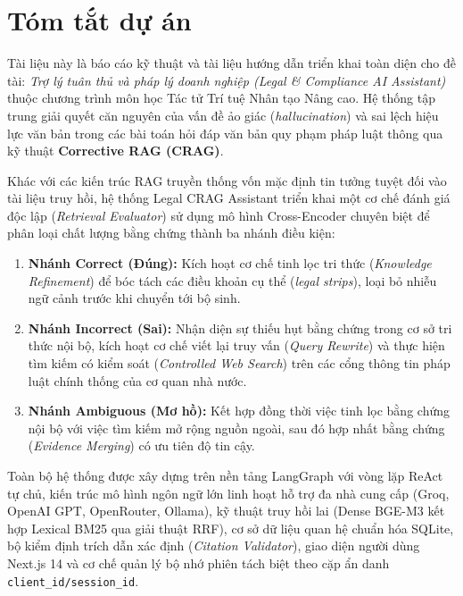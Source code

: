 \documentclass[12pt,a4paper,oneside]{report}
\begin{document}


\setcounter{page}{1}

\chapter*{Tóm tắt dự án}

Tài liệu này là báo cáo kỹ thuật và tài liệu hướng dẫn triển khai toàn diện cho đề tài: \textit{Trợ lý tuân thủ và pháp lý doanh nghiệp (Legal \& Compliance AI Assistant)} thuộc chương trình môn học Tác tử Trí tuệ Nhân tạo Nâng cao. Hệ thống tập trung giải quyết căn nguyên của vấn đề ảo giác (\textit{hallucination}) và sai lệch hiệu lực văn bản trong các bài toán hỏi đáp văn bản quy phạm pháp luật thông qua kỹ thuật \textbf{Corrective RAG (CRAG)}.

Khác với các kiến trúc RAG truyền thống vốn mặc định tin tưởng tuyệt đối vào tài liệu truy hồi, hệ thống Legal CRAG Assistant triển khai một cơ chế đánh giá độc lập (\textit{Retrieval Evaluator}) sử dụng mô hình Cross-Encoder chuyên biệt để phân loại chất lượng bằng chứng thành ba nhánh điều kiện:
\begin{enumerate}
    \item \textbf{Nhánh Correct (Đúng):} Kích hoạt cơ chế tinh lọc tri thức (\textit{Knowledge Refinement}) để bóc tách các điều khoản cụ thể (\textit{legal strips}), loại bỏ nhiễu ngữ cảnh trước khi chuyển tới bộ sinh.
    \item \textbf{Nhánh Incorrect (Sai):} Nhận diện sự thiếu hụt bằng chứng trong cơ sở tri thức nội bộ, kích hoạt cơ chế viết lại truy vấn (\textit{Query Rewrite}) và thực hiện tìm kiếm có kiểm soát (\textit{Controlled Web Search}) trên các cổng thông tin pháp luật chính thống của cơ quan nhà nước.
    \item \textbf{Nhánh Ambiguous (Mơ hồ):} Kết hợp đồng thời việc tinh lọc bằng chứng nội bộ với việc tìm kiếm mở rộng nguồn ngoài, sau đó hợp nhất bằng chứng (\textit{Evidence Merging}) có ưu tiên độ tin cậy.
\end{enumerate}

Toàn bộ hệ thống được xây dựng trên nền tảng LangGraph với vòng lặp ReAct tự chủ, kiến trúc mô hình ngôn ngữ lớn linh hoạt hỗ trợ đa nhà cung cấp (Groq, OpenAI GPT, OpenRouter, Ollama), kỹ thuật truy hồi lai (Dense BGE-M3 kết hợp Lexical BM25 qua giải thuật RRF), cơ sở dữ liệu quan hệ chuẩn hóa SQLite, bộ kiểm định trích dẫn xác định (\textit{Citation Validator}), giao diện người dùng Next.js 14 và cơ chế quản lý bộ nhớ phiên tách biệt theo cặp ẩn danh \texttt{client\_id/session\_id}.
\end{document}
